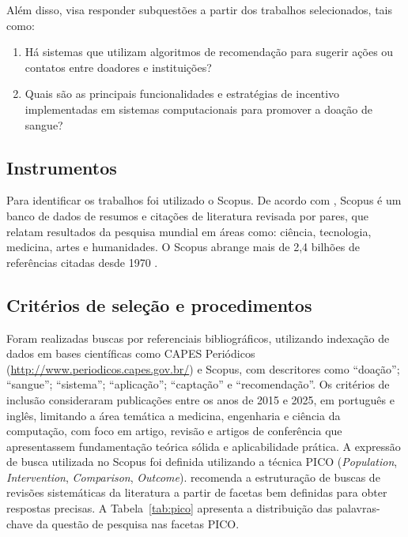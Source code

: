 Além disso, visa responder subquestões a partir dos trabalhos selecionados, tais como:

\begin{enumerate}[leftmargin=*, label=1.\arabic*)]
  \item Há sistemas que utilizam algoritmos de recomendação para sugerir ações ou contatos entre doadores e instituições?
  \item Quais são as principais funcionalidades e estratégias de incentivo implementadas em sistemas computacionais para promover a doação de sangue?
\end{enumerate}

\subsection{Instrumentos}

Para identificar os trabalhos foi utilizado o Scopus. De acordo com , Scopus é um banco de dados de resumos e citações de literatura revisada por pares, que relatam resultados da pesquisa mundial em áreas como: ciência, tecnologia, medicina, artes e humanidades. O Scopus abrange mais de 2,4 bilhões de referências citadas desde 1970 \cite{elsevier2025}.

\subsection{Critérios de seleção e procedimentos}

Foram realizadas buscas por referenciais bibliográficos, utilizando indexação de dados em bases científicas como CAPES Periódicos (\url{http://www.periodicos.capes.gov.br/}) e Scopus, com descritores como ``doação''; ``sangue''; ``sistema''; ``aplicação''; ``captação'' e ``recomendação''. Os critérios de inclusão consideraram publicações entre os anos de 2015 e 2025, em português e inglês, limitando a área temática a medicina, engenharia e ciência da computação, com foco em artigo, revisão e artigos de conferência que apresentassem fundamentação teórica sólida e aplicabilidade prática. A expressão de busca utilizada no Scopus foi definida utilizando a técnica PICO (\textit{Population}, \textit{Intervention}, \textit{Comparison}, \textit{Outcome}).  recomenda a estruturação de buscas de revisões sistemáticas da literatura a partir de facetas bem definidas para obter respostas precisas. A Tabela~\ref{tab:pico} apresenta a distribuição das palavras-chave da questão de pesquisa nas facetas PICO.

